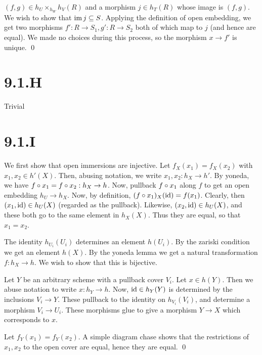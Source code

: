 \documentclass{article}
\begin{document}
$(f,g) \in h_U\times_{h_W}h_V(R)$ and a morphism $j \in h_T(R)$ whose image is
$(f, g)$. We wish to show that $\operatorname{im} j \subseteq S$. Applying
the definition of open embedding, we get two morphisms $f': R \to S_1, g': R \to S_2$
both of which map to $j$ (and hence are equal). We made no
choices during this process, so the morphism $x \to f'$ is unique.
\qed

\section{9.1.H}
Trivial

\section{9.1.I}
We first show that open immersions are injective. Let $f_X(x_1)=f_X(x_2)$
with $x_1, x_2 \in h'(X)$. Then, abusing notation, we write
$x_1, x_2: h_X \to h'$. By yoneda, we have $f\circ x_1=f\circ x_2: h_X \to h$. Now,
pullback $f\circ x_1$ along $f$ to get an open
embedding $h_U \to h_X$. Now, by definition, $(f \circ x_1)_X(\operatorname{id})=f(x_1)$.
Clearly, then $(x_1,\operatorname{id}) \in h_U(X)$ (regarded as the pullback). Likewise,
$(x_2, \operatorname{id}) \in h_U(X)$, and these both go to the same element in
$h_X(X)$. Thus they are equal, so that $x_1 = x_2$.

The identity $h_{U_i}(U_i)$ determines an element
$h(U_i)$. By the zariski condition we get an element
$h(X)$. By the yoneda lemma we get a natural transformation
$f: h_X \to h$. We wish to show that this is bijective.

Let $Y$ be an arbitrary scheme with a pullback cover
$V_i$. Let $x \in h(Y)$. Then we abuse notation to
write $x: h_Y \to h$. Now, $\operatorname{id} \in h_Y(Y)$ is determined by
the inclusions $V_i \to Y$. These pullback to the identity on
$h_{V_i}(V_i)$, and determine a morphism $V_i \to U_i$.
These morphisms glue to give a morphism $Y \to X$ which
corresponds to $x$.

Let $f_Y(x_1)=f_Y(x_2)$. A simple diagram chase shows that the restrictions
of $x_1, x_2$ to the open cover are equal, hence they are equal.
\qed
\end{document}
